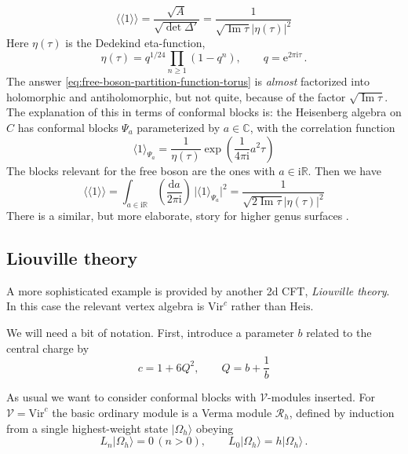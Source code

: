 \documentclass[12pt,letterpaper,reqno]{amsart}
\numberwithin{equation}{section}
\newcommand{\Heis}{{\mathrm{Heis}}}
\newcommand{\Vir}{{\mathrm{Vir}}}
\newcommand{\bbR}{\ensuremath{\mathbb R}}
\newcommand{\bbC}{\ensuremath{\mathbb C}}
\newcommand{\I}{{\mathrm i}}
\newcommand{\e}{{\mathrm e}}
\newcommand\vach{{|\Omega_h\rangle}}
\newcommand{\de}{\mathrm{d}}
\newcommand{\vertex}{\mathcal{V}}
\newcommand{\vrep}{\mathcal{R}}
\newcommand{\abs}[1]{\lvert#1\rvert}
\newcommand{\IP}[1]{\langle#1\rangle}
\newcommand{\DIP}[1]{\langle\!\langle#1\rangle\!\rangle}
\newcommand{\ti}[1]{\textit{#1}}
\DeclareMathOperator{\im}{Im}
\begin{document}
\begin{equation} \label{eq:free-boson-partition-function-torus}
  \DIP{1} = \frac{\sqrt{A}}{\sqrt{\det \Delta'}} = \frac{1}{\sqrt{\im \tau} \abs{\eta(\tau)}^2}
  \end{equation}
Here $\eta(\tau)$ is the Dedekind eta-function,
\begin{equation}
  \eta(\tau) = q^{1/24} \prod_{n \ge 1} (1 - q^n), \qquad q = \e^{2 \pi \I \tau} \, .
\end{equation}
The answer \eqref{eq:free-boson-partition-function-torus} is \ti{almost} factorized into holomorphic and antiholomorphic, 
but not quite, because
of the factor $\sqrt{\im \tau}$.
The explanation of this in terms of conformal blocks is: the Heisenberg algebra on $C$
has conformal blocks $\Psi_a$ parameterized by $a \in \bbC$, with the correlation function
\begin{equation}
  \IP{1}_{\Psi_a} = \frac{1}{\eta(\tau)} \exp\left(\frac{1}{4 \pi \I} a^2 \tau\right)
\end{equation}
The blocks relevant for the free boson are the ones with $a \in \I \bbR$.
Then we have
\begin{equation} \label{eq:factorization-free-boson}
  \DIP{1} = \int_{a \in \I \bbR} \left(  \frac{\de a}{2 \pi \I} \right) \, \abs{\IP{1}_{\Psi_a}}^2  = \frac{1}{\sqrt{2 \im \tau} \abs{\eta(\tau)}^2}
\end{equation}
There is a similar, but more elaborate, story for 
higher genus surfaces \cite{McIntyreTakhtajan2006}.


\subsection{Liouville theory}

A more sophisticated example is provided by another 2d
CFT, \ti{Liouville theory}. In this case the relevant
vertex algebra is $\Vir^c$ rather than $\Heis$.

We will need a bit of notation. First, introduce a parameter $b$
related to the central charge by
\begin{equation}
c = 1 + 6 Q^2, \qquad Q = b + \frac{1}{b}
\end{equation}

As usual we want to consider conformal blocks with 
$\vertex$-modules inserted. For $\vertex = \Vir^c$
the basic ordinary module is a Verma
module $\vrep_h$, defined by induction from a single
highest-weight state $\vach$ obeying
\begin{equation}
  L_n \vach = 0 \, (n > 0), \qquad L_0 \vach = h \vach \, .
\end{equation}
\end{document}
